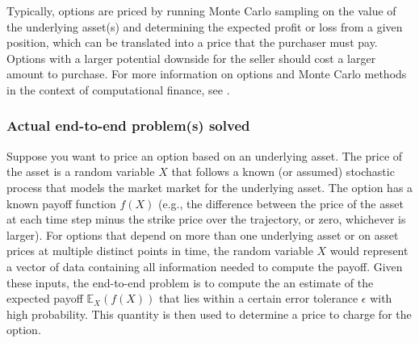 \begin{refsection}
Typically, options are priced by running Monte Carlo sampling on the value of the underlying asset(s) and determining the expected profit or loss from a given position, which can be translated into a price that the purchaser must pay. Options with a larger potential downside for the seller should cost a larger amount to purchase. For more information on options and Monte Carlo methods in the context of computational finance, see \cite{hull2017optionsTextbook,glasserman2004monte}.


\subsubsection*{Actual end-to-end problem(s) solved}

Suppose you want to price an option based on an underlying asset. The price of the asset is a random variable $X$ that follows a known (or assumed) stochastic process that models the market market for the underlying asset. The option has a known payoff function $f(X)$ (e.g., the difference between the price of the asset at each time step minus the strike price over the trajectory, or zero, whichever is larger). For options that depend on more than one underlying asset or on asset prices at multiple distinct points in time, the random variable $X$ would represent a vector of data containing all information needed to compute the payoff.  Given these inputs, the end-to-end problem is to compute the an estimate of the expected payoff $\mathbb{E}_{X}(f(X))$ that lies within a certain error tolerance $\epsilon$ with high probability. This quantity is then used to determine a price to charge for the option.


\end{refsection}
